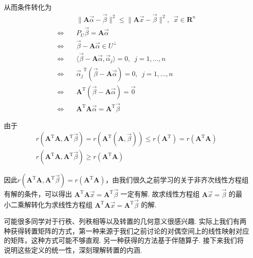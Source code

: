 从而条件转化为
\begin{align*}
               & \lVert \mathbf{A}\vec{\alpha} - \vec{\beta} \rVert^{2} \leqslant \lVert \mathbf{A}\vec{x} - \vec{\beta} \rVert^{2}, \enspace \vec{x} \in \mathbf{R}^{n} \\
    \iff \quad & P_U \vec{\beta} = \mathbf{A}\vec{\alpha}                                                                                                                \\
    \iff \quad & \vec{\beta} - \mathbf{A}\vec{\alpha} \in U^{\perp}                                                                                                      \\
    \iff \quad & \langle \vec{\beta} - \mathbf{A}\vec{\alpha}, \vec{\alpha} _j \rangle = 0, \enspace j = 1, \ldots , n                                                   \\
    \iff \quad & {\vec{\alpha} _j}^{\mathrm{T}}(\vec{\beta} - \mathbf{A}\vec{\alpha}) = 0, \enspace j = 1, \ldots , n                                                    \\
    \iff \quad & \mathbf{A}^{\mathrm{T}}(\vec{\beta} - \mathbf{A}\vec{\alpha}) = \vec{0}                                                                                 \\
    \iff \quad & \mathbf{A}^{\mathrm{T}}\mathbf{A}\vec{\alpha} = \mathbf{A}^{\mathrm{T}}\vec{\beta}
\end{align*}

由于
\begin{gather*}
    r(\mathbf{A}^{\mathrm{T}}\mathbf{A}, \mathbf{A}^{\mathrm{T}}\vec{\beta})= r (\mathbf{A}^{\mathrm{T}}(\mathbf{A}, \vec{\beta})) \leqslant r(\mathbf{A}^{\mathrm{T}}) = r(\mathbf{A}^{\mathrm{T}}\mathbf{A}) \\
    r(\mathbf{A}^{\mathrm{T}}\mathbf{A}, \mathbf{A}^{\mathrm{T}}\vec{\beta}) \geqslant r(\mathbf{A}^{\mathrm{T}}\mathbf{A})
\end{gather*}

因此$r(\mathbf{A}^{\mathrm{T}}\mathbf{A}, \mathbf{A}^{\mathrm{T}}\vec{\beta}) = r(\mathbf{A}^{\mathrm{T}}\mathbf{A})$，由我们很久之前学习的关于非齐次线性方程组有解的条件，可以得出 $ \mathbf{A}^{\mathrm{T}}\mathbf{A}\vec{x} = \mathbf{A}^{\mathrm{T}}\vec{\beta}$ 一定有解. 故求线性方程组 $\mathbf{A}\vec{x} = \vec{\beta}$ 的最小二乘解转化为求线性方程组 $ \mathbf{A}^{\mathrm{T}}\mathbf{A}\vec{x} = \mathbf{A}^{\mathrm{T}}\vec{\beta}$ 的解.

可能很多同学对于行秩、列秩相等以及转置的几何意义很感兴趣. 实际上我们有两种获得转置矩阵的方式，第一种来源于我们之前讨论的对偶空间上的线性映射对应的矩阵，这种方式可能不够直观. 另一种获得的方法基于伴随算子. 接下来我们将说明这些定义的统一性，深刻理解转置的内涵.

